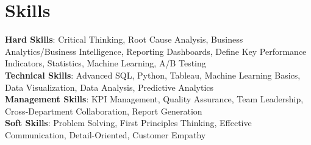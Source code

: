 \section{Skills}
  \begin{itemize}[leftmargin=0.1in, label={}]
    \normalsize{\item{
      \textbf{Hard Skills}: Critical Thinking, Root Cause Analysis, Business Analytics/Business Intelligence, Reporting Dashboards, Define Key Performance Indicators, Statistics, Machine Learning, A/B Testing \\
      \textbf{Technical Skills}: Advanced SQL, Python, Tableau, Machine Learning Basics, Data Visualization, Data Analysis, Predictive Analytics \\
      \textbf{Management Skills}: KPI Management, Quality Assurance, Team Leadership, Cross-Department Collaboration, Report Generation \\
      \textbf{Soft Skills}: Problem Solving, First Principles Thinking, Effective Communication, Detail-Oriented, Customer Empathy \\
     }}
  \end{itemize}
